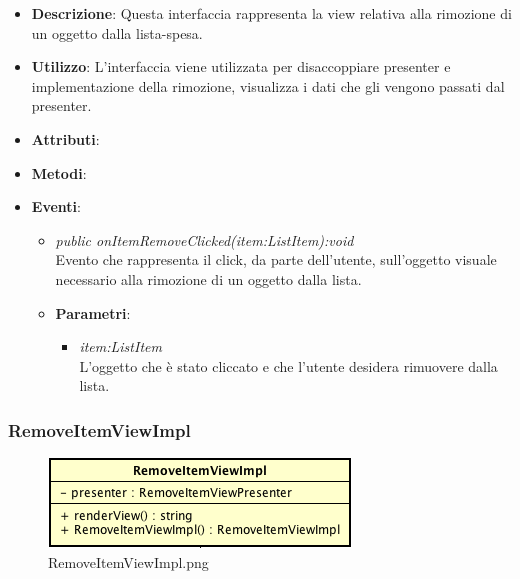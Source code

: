 \begin{itemize}
\item \textbf{Descrizione}: Questa interfaccia rappresenta la view relativa alla rimozione di un oggetto dalla lista-spesa.
\item \textbf{Utilizzo}: L'interfaccia viene utilizzata per disaccoppiare presenter e implementazione della rimozione, visualizza i dati che gli vengono passati dal presenter.
\item \textbf{Attributi}: 
\item \textbf{Metodi}:
\item \textbf{Eventi}:
	\begin{itemize}	
	\item \textit{public onItemRemoveClicked(item:ListItem):void}\\
	Evento che rappresenta il click, da parte dell'utente, sull'oggetto visuale necessario alla rimozione di un oggetto dalla lista.
			\item{\textbf{Parametri}: \begin{itemize}
			\item \textit{item:ListItem}\\
			L'oggetto che è stato cliccato e che l'utente desidera rimuovere dalla lista.
			\end{itemize}}
	\end{itemize}
\end{itemize}

\subsubsection{RemoveItemViewImpl}

\label{RemoveItemViewImpl}
\begin{figure}[ht]
	\centering
	\includegraphics[scale=0.5]{Sezioni/SottosezioniST/img/app/RemoveItemViewImpl.png}
	\caption{RemoveItemViewImpl.png}
\end{figure}

